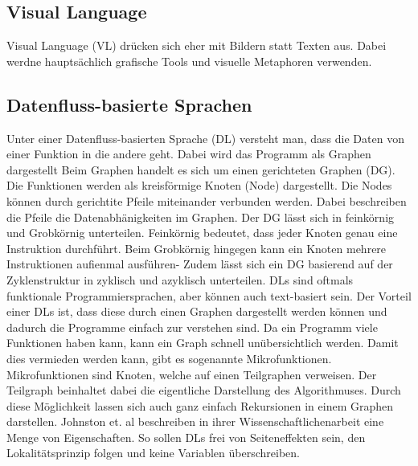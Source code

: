 \documentclass{article}
\begin{document}
    \subsection{Visual Language}
    Visual Language (VL) drücken sich eher mit Bildern statt Texten aus. \cite{5}
    Dabei werdne hauptsächlich grafische Tools und visuelle Metaphoren verwenden. \cite{16}
    \subsection{Datenfluss-basierte Sprachen}
    Unter einer Datenfluss-basierten Sprache (DL) versteht man, dass die Daten von einer Funktion in die andere geht. Dabei wird das Programm als Graphen dargestellt\cite{11}
    Beim Graphen handelt es sich um einen gerichteten Graphen (DG). Die Funktionen werden als kreisförmige Knoten (Node) dargestellt. Die Nodes können durch gerichtite Pfeile miteinander verbunden werden. Dabei beschreiben die Pfeile die Datenabhänigkeiten im Graphen.\cite{2}
    Der DG lässt sich in feinkörnig und Grobkörnig unterteilen. Feinkörnig bedeutet, dass jeder Knoten genau eine Instruktion durchführt. Beim Grobkörnig hingegen kann ein Knoten mehrere Instruktionen aufienmal ausführen-\cite{1}
    Zudem lässt sich ein DG basierend auf der Zyklenstruktur in zyklisch und azyklisch unterteilen. \cite{8}
    DLs sind oftmals funktionale Programmiersprachen, aber können auch text-basiert sein. \cite{2}
    Der Vorteil einer DLs ist, dass diese durch einen Graphen dargestellt werden können \cite{11} und dadurch die Programme einfach zur verstehen sind. \cite{6}
    Da ein Programm viele Funktionen haben kann, kann ein Graph schnell unübersichtlich werden. Damit dies vermieden werden kann, gibt es sogenannte Mikrofunktionen. Mikrofunktionen sind Knoten, welche auf einen Teilgraphen verweisen. Der Teilgraph beinhaltet dabei die eigentliche Darstellung des Algorithmuses. Durch diese Möglichkeit lassen sich auch ganz einfach Rekursionen in einem Graphen darstellen.\cite{11}
    Johnston et. al beschreiben in ihrer Wissenschaftlichenarbeit eine Menge von Eigenschaften. So sollen DLs frei von Seiteneffekten sein, den Lokalitätsprinzip folgen und keine Variablen überschreiben.\cite{2}
\end{document}

